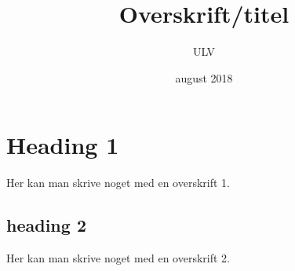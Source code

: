 \documentclass[danmark]{../UNF}
\title{Overskrift/titel}
\author{ULV}
\date{august 2018}
\begin{document}
\maketitle

\section{Heading 1}
Her kan man skrive noget med en overskrift 1.

\subsection{heading 2}
Her kan man skrive noget med en overskrift 2.
\end{document}
